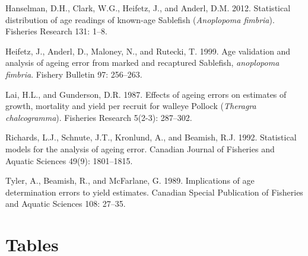\documentclass[11pt]{book}
\begin{document}
\leavevmode\hypertarget{ref-hanselman2012statistical}{}%
Hanselman, D.H., Clark, W.G., Heifetz, J., and Anderl, D.M. 2012. Statistical distribution of age readings of known-age Sablefish (\emph{Anoplopoma fimbria}). Fisheries Research 131: 1--8.

\leavevmode\hypertarget{ref-heifetz1999age}{}%
Heifetz, J., Anderl, D., Maloney, N., and Rutecki, T. 1999. Age validation and analysis of ageing error from marked and recaptured Sablefish, \emph{anoplopoma fimbria}. Fishery Bulletin 97: 256--263.

\leavevmode\hypertarget{ref-lai1987effects}{}%
Lai, H.L., and Gunderson, D.R. 1987. Effects of ageing errors on estimates of growth, mortality and yield per recruit for walleye Pollock (\emph{Theragra chalcogramma}). Fisheries Research 5(2-3): 287--302.

\leavevmode\hypertarget{ref-richards1992statistical}{}%
Richards, L.J., Schnute, J.T., Kronlund, A., and Beamish, R.J. 1992. Statistical models for the analysis of ageing error. Canadian Journal of Fisheries and Aquatic Sciences 49(9): 1801--1815.

\leavevmode\hypertarget{ref-tyler1989implications}{}%
Tyler, A., Beamish, R., and McFarlane, G. 1989. Implications of age determination errors to yield estimates. Canadian Special Publication of Fisheries and Aquatic Sciences 108: 27--35.

\setlength{\parindent}{0in} 
\setlength{\leftskip}{0in} 
\setlength{\parskip}{4pt}

\newpage
\setcounter{table}{0}

\hypertarget{tables}{%
\section{Tables}\label{tables}}
\end{document}
